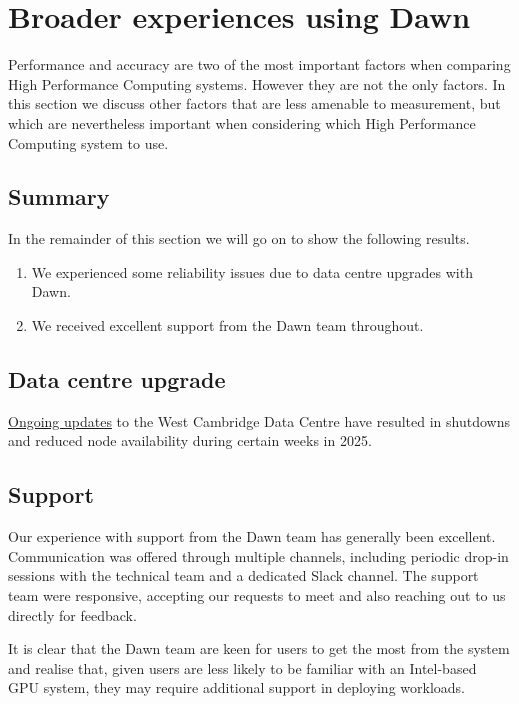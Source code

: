 \section{Broader experiences using Dawn}

Performance and accuracy are two of the most important factors when comparing High Performance Computing systems. However they are not the only factors. In this section we discuss other factors that are less amenable to measurement, but which are nevertheless important when considering which High Performance Computing system to use.

\subsection{Summary}

In the remainder of this section we will go on to show the following results.

\begin{enumerate}
    \item We experienced some reliability issues due to data centre upgrades with Dawn.
    \item We received excellent support from the Dawn team throughout.
\end{enumerate}

\subsection{Data centre upgrade}

\href{https://docs.hpc.cam.ac.uk/hpc/data_centre_upgrade.html}{Ongoing updates} to the West Cambridge Data Centre have resulted in shutdowns and reduced node availability during certain weeks in 2025.

\subsection{Support}

Our experience with support from the Dawn team has generally been excellent. Communication was offered through multiple channels, including periodic drop-in sessions with the technical team and a dedicated Slack channel. The support team were responsive, accepting our requests to meet and also reaching out to us directly for feedback.

It is clear that the Dawn team are keen for users to get the most from the system and realise that, given users are less likely to be familiar with an Intel-based GPU system, they may require additional support in deploying workloads.

